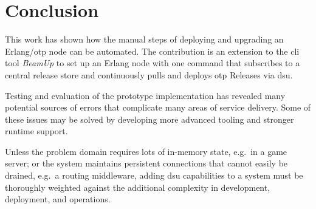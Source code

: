 \cleardoublepage
\section{Conclusion}

This work has shown how the manual steps of deploying and upgrading an Erlang/\acrshort{otp} node can be automated. The contribution is an extension to the \acrshort{cli} tool \emph{BeamUp} to set up an Erlang node with one command that subscribes to a central release store and continuously pulls and deploys \acrshort{otp} Releases via \acrshort{dsu}.

Testing and evaluation of the prototype implementation has revealed many potential sources of errors that complicate many areas of service delivery. Some of these issues may be solved by developing more advanced tooling and stronger runtime support.

Unless the problem domain requires lots of in-memory state, e.g.~in a game server; or the system maintains persistent connections that cannot easily be drained, e.g.~a routing middleware, adding \acrshort{dsu} capabilities to a system must be thoroughly weighted against the additional complexity in development, deployment, and operations.
